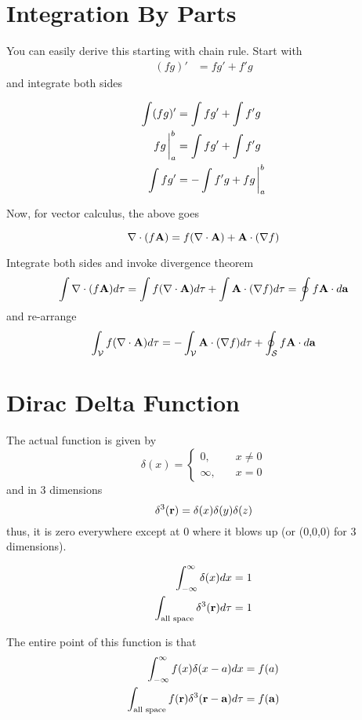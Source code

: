 \documentclass{article}
\begin{document}
\section{Integration By Parts}

You can easily derive this starting with chain rule.  Start with
\begin{align*}
(fg)' & = fg' + f'g    
\end{align*}
and integrate both sides

\begin{align*}
\int (fg)' & = \int fg' + \int f'g   \\
fg \eval_a^b & = \int fg' + \int f'g \\
\int fg'& = -\int f'g + fg \eval_a^b
\end{align*}

Now, for vector calculus, the above goes

$$
\nabla \cdot (f\vb{A}) = f(\nabla \cdot \vb{A}) + \vb{A} \cdot (\nabla f)
$$

Integrate both sides and invoke divergence theorem
$$
\int \nabla \cdot (f\vb{A}) d\tau = \int f(\nabla \cdot \vb{A}) d\tau +  \int \vb{A} \cdot (\nabla f) d\tau = \oint f\vb{A} \cdot d\vb{a}
$$
and re-arrange
$$
\int_{\mathcal{V}} f(\nabla \cdot \vb{A}) d\tau = - \int_{\mathcal{V}} \vb{A} \cdot (\nabla f) d\tau + \oint_{\mathcal{S}} f\vb{A} \cdot d\vb{a}
$$

\section{Dirac Delta Function}
The actual function is given by 
$$
\delta(x) = 
\begin{cases}
0, &\quad x \neq 0 \\
\infty, &\quad x = 0
\end{cases}
$$
and in 3 dimensions
$$
\delta^3(\vb{r}) = \delta(x) \delta(y) \delta(z)
$$
thus, it is zero everywhere except at 0 where it blows up (or (0,0,0) for 3 dimensions).

\begin{align*}
\int_{-\infty}^{\infty} \delta(x) dx & = 1 \\
\int_{\text{all space}} \delta^3{(\vb{r})} d\tau & = 1
\end{align*}

The entire point of this function is that
\begin{align*}
\int_{-\infty}^{\infty} f(x) \delta(x-a) dx & = f(a) \\ \int_{\text{all space}} f(\vb{r})\delta^3{(\vb{r-\vb{a}})} d\tau &  = f(\vb{a})
\end{align*}
\end{document}
